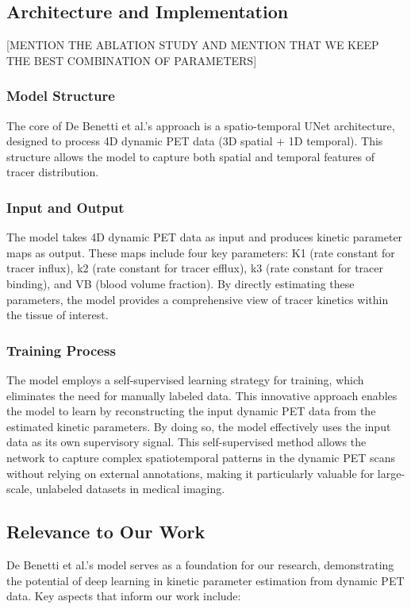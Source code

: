 \subsection{Architecture and Implementation}

[MENTION THE ABLATION STUDY AND MENTION THAT WE KEEP THE BEST COMBINATION OF PARAMETERS]

\subsubsection{Model Structure}
The core of De Benetti et al.'s approach is a spatio-temporal UNet architecture, designed to process 4D dynamic PET data (3D spatial + 1D temporal). This structure allows the model to capture both spatial and temporal features of tracer distribution.

\subsubsection{Input and Output}

The model takes 4D dynamic PET data as input and produces kinetic parameter maps as output. These maps include four key parameters: K1 (rate constant for tracer influx), k2 (rate constant for tracer efflux), k3 (rate constant for tracer binding), and VB (blood volume fraction). By directly estimating these parameters, the model provides a comprehensive view of tracer kinetics within the tissue of interest.

\subsubsection{Training Process}
The model employs a self-supervised learning strategy for training, which eliminates the need for manually labeled data. This innovative approach enables the model to learn by reconstructing the input dynamic PET data from the estimated kinetic parameters. By doing so, the model effectively uses the input data as its own supervisory signal. This self-supervised method allows the network to capture complex spatiotemporal patterns in the dynamic PET scans without relying on external annotations, making it particularly valuable for large-scale, unlabeled datasets in medical imaging.

\subsection{Relevance to Our Work}
De Benetti et al.'s model serves as a foundation for our research, demonstrating the potential of deep learning in kinetic parameter estimation from dynamic PET data. Key aspects that inform our work include:

